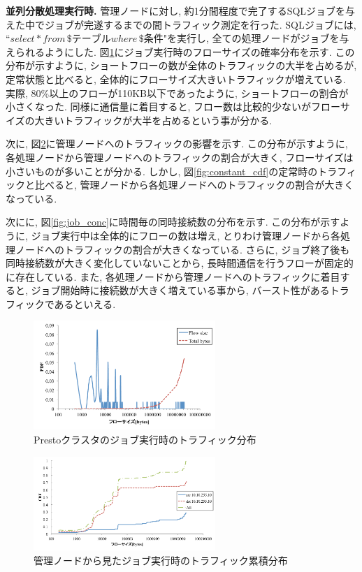 \documentclass[11pt, a4paper, twocolumn]{jsarticle}
\begin{document}
{\bf 並列分散処理実行時. }
管理ノードに対し, 約1分間程度で完了するSQLジョブを与えた中でジョブが完遂するまでの間トラフィック測定を行った.
SQLジョブには, ``$select * from \, \$テーブル where \, \$条件$"を実行し,
全ての処理ノードがジョブを与えられるようにした.
図\ref{fig:job}にジョブ実行時のフローサイズの確率分布を示す.
この分布が示すように, ショートフローの数が全体のトラフィックの大半を占めるが, 定常状態と比べると,
全体的にフローサイズ大きいトラフィックが増えている.
実際, 80\%以上のフローが110KB以下であったように, ショートフローの割合が小さくなった.
同様に通信量に着目すると, フロー数は比較的少ないがフローサイズの大きいトラフィックが大半を占めるという事が分かる.

次に, 図\ref{fig:job_cdf}に管理ノードへのトラフィックの影響を示す.
この分布が示すように, 各処理ノードから管理ノードへのトラフィックの割合が大きく, フローサイズは小さいものが多いことが分かる.
しかし, 図\ref{fig:constant_cdf}の定常時のトラフィックと比べると,
管理ノードから各処理ノードへのトラフィックの割合が大きくなっている.

次にに, 図\ref{fig:job_conc}に時間毎の同時接続数の分布を示す.
この分布が示すように, ジョブ実行中は全体的にフローの数は増え, とりわけ管理ノードから各処理ノードへのトラフィックの割合が大きくなっている.
さらに, ジョブ終了後も同時接続数が大きく変化していないことから, 長時間通信を行うフローが固定的に存在している.
また, 各処理ノードから管理ノードへのトラフィックに着目すると, ジョブ開始時に接続数が大きく増えている事から, バースト性があるトラフィックであるといえる.

\begin{figure}[t]
    \begin{center}
    \includegraphics[autoebb, width=195pt]{./img/job.pdf}
    \caption{Prestoクラスタのジョブ実行時のトラフィック分布}
    \label{fig:job}
    \end{center}
\end{figure}

\begin{figure}[t]
    \begin{center}
    \includegraphics[autoebb, width=195pt]{./img/job_cdf.pdf}
    \caption{管理ノードから見たジョブ実行時のトラフィック累積分布}
    \label{fig:job_cdf}
    \end{center}
\end{figure}
\end{document}
